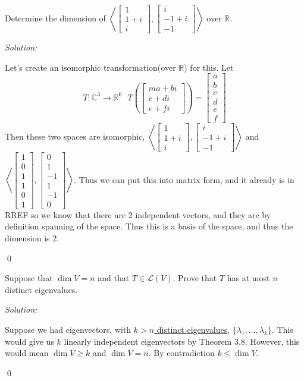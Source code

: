 \documentclass[12 pt]{article}
\newenvironment{problem}[2][Problem]{\begin{trivlist}
\item[\hskip \labelsep {\bfseries #1}\hskip \labelsep {\bfseries #2.}]}{\end{trivlist}}
\newenvironment{sol}
    {\emph{Solution:}
    }
    {
    \qed
    }
\theoremstyle{definition}
\newcommand{\C}{\mathbb{C}} %
\newcommand{\R}{\mathbb{R}} %
\renewcommand{\b}{\beta}
\begin{document}
\begin{problem}{3.3.8g}
Determine the dimension of
$\left<\begin{bmatrix}
1\\1+i\\i
\end{bmatrix},\begin{bmatrix}
i\\-1+i\\-1
\end{bmatrix}  \right >$ over $\R$.
\end{problem}
\begin{sol}
Let's create an isomorphic transformation(over $\R$) for this. Let \[T:\C^3\to\R^6\ \ \ T\left(\begin{bmatrix}m 
a+bi\\c+di\\e+fi
\end{bmatrix}\right)=\begin{bmatrix}
a\\b\\c\\d\\e\\f
\end{bmatrix}\]
Then these two spaces are isomorphic,
$\left<\begin{bmatrix}
1\\1+i\\i
\end{bmatrix},\begin{bmatrix}
i\\-1+i\\-1
\end{bmatrix}\right >$ and
$\left<
\begin{bmatrix}
1\\0\\1\\1\\0\\1
\end{bmatrix},\begin{bmatrix}
0\\1\\-1\\1\\-1\\0
\end{bmatrix}
\right >$. Thus we can put this into matrix form, and it already is in RREF so we know that there are 2 independent vectors, and they are by definition spanning of the space. Thus this is a basis of the space, and thus the dimension is 2.
\end{sol}

\begin{problem}{3.3.12}
Suppose that $\dim V = n$ and that $T\in \mathscr{L}(V)$. Prove that $T$ has at most $n$ distinct eigenvalues.
\end{problem}
\begin{sol}
Suppose we had eigenvectors, with \underline{$k > n$ distinct eigenvalues}, $\{\lambda_1,\dots,\lambda_k\}$. This would give us $k$ linearly independent eigenvectors by Theorem 3.8. However, this would mean $\dim V \geq k$ and $\dim V = n$. By contradiction $k \leq \dim V$.
\end{sol}
\end{document}
